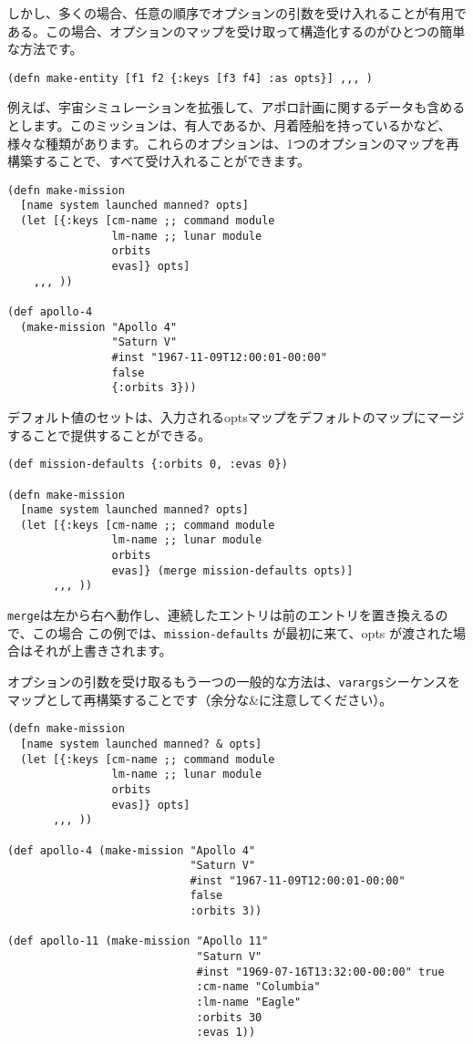 しかし、多くの場合、任意の順序でオプションの引数を受け入れることが有用である。この場合、オプションのマップを受け取って構造化するのがひとつの簡単な方法です。

\begin{lstlisting}[numbers=none]
(defn make-entity [f1 f2 {:keys [f3 f4] :as opts}] ,,, )
\end{lstlisting}

例えば、宇宙シミュレーションを拡張して、アポロ計画に関するデータも含めるとします。このミッションは、有人であるか、月着陸船を持っているかなど、様々な種類があります。これらのオプションは、1つのオプションのマップを再構築することで、すべて受け入れることができます。


\begin{lstlisting}[numbers=none]
(defn make-mission
  [name system launched manned? opts]
  (let [{:keys [cm-name ;; command module
                lm-name ;; lunar module
                orbits
                evas]} opts]
    ,,, ))

(def apollo-4
  (make-mission "Apollo 4"
                "Saturn V"
                #inst "1967-11-09T12:00:01-00:00"
                false
                {:orbits 3}))
\end{lstlisting}

デフォルト値のセットは、入力されるoptsマップをデフォルトのマップにマージすることで提供することができる。

\begin{lstlisting}[numbers=none]
(def mission-defaults {:orbits 0, :evas 0})

(defn make-mission
  [name system launched manned? opts]
  (let [{:keys [cm-name ;; command module
                lm-name ;; lunar module
                orbits
                evas]} (merge mission-defaults opts)]
       ,,, ))
\end{lstlisting}

\texttt{merge}は左から右へ動作し、連続したエントリは前のエントリを置き換えるので、この場合 この例では、\texttt{mission-defaults} が最初に来て、opts が渡された場合はそれが上書きされます。

オプションの引数を受け取るもう一つの一般的な方法は、\texttt{varargs}シーケンスをマップとして再構築することです（余分な\&に注意してください）。

\begin{lstlisting}[numbers=none]
(defn make-mission
  [name system launched manned? & opts]
  (let [{:keys [cm-name ;; command module
                lm-name ;; lunar module
                orbits
                evas]} opts]
       ,,, ))

(def apollo-4 (make-mission "Apollo 4"
                            "Saturn V"
                            #inst "1967-11-09T12:00:01-00:00"
                            false
                            :orbits 3))

(def apollo-11 (make-mission "Apollo 11"
                             "Saturn V"
                             #inst "1969-07-16T13:32:00-00:00" true
                             :cm-name "Columbia"
                             :lm-name "Eagle"
                             :orbits 30
                             :evas 1))
\end{lstlisting}

